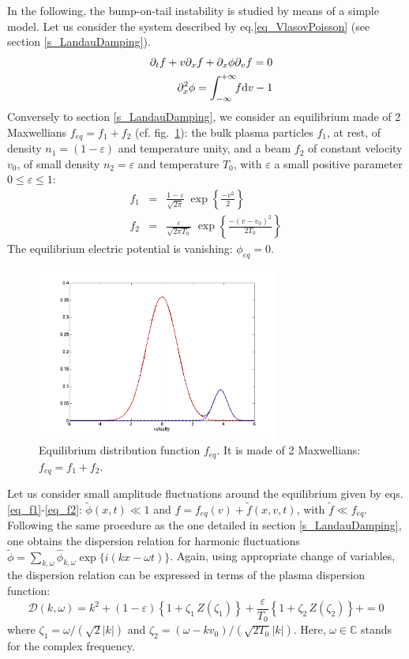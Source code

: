 \documentclass[11pt]{article}
\newcommand{\dd}{\textrm d}
\newcommand{\beqa}{\begin{eqnarray}}
\newcommand{\eeqa}{\end{eqnarray}}
\begin{document}
In the following, the bump-on-tail instability is studied by means of a simple model. Let us consider the system described by eq.\eqref{eq_VlasovPoisson} (see section \ref{s_LandauDamping}).
\beqa
  && \partial_t f + v\partial_x f + \partial_x\phi \partial_v f = 0
  \label{eq_Vlasov2D} \\
  && \partial_x^2\phi = \int_{-\infty}^{+\infty}\!\! f\dd v - 1
  \label{eq_Poisson2D}
\eeqa
Conversely to section \ref{s_LandauDamping}, we consider an equilibrium made of 2 Maxwellians $f_{eq} = f_1 +f_2$ (cf. fig.~\ref{fig_BonT_Feq}): the bulk plasma particles $f_1$, at rest, of density $n_1=(1-\varepsilon)$ and temperature unity, and a beam $f_2$ of constant velocity $v_0$, of small density $n_2=\varepsilon$ and temperature $T_0$, with $\varepsilon$ a small positive parameter $0\leq \varepsilon \leq1$:
\beqa
f_1 &=& \frac{1-\varepsilon}{\sqrt{2\pi}}\; \exp\left\{ \frac{-v^2}{2}\right\}
\label{eq_f1} \\
f_2 &=& \frac{\varepsilon}{\sqrt{2\pi T_0}}\;
\exp\left\{ \frac{-(v-v_0)^2}{2T_0}\right\}
\label{eq_f2}
\eeqa
The equilibrium electric potential is vanishing: $\phi_{eq}=0$. \\

\begin{figure}[!h]
\begin{center}
  \includegraphics[width=8cm]{Figures/Fig_Feq_BoT.png}
\caption{Equilibrium distribution function $f_{eq}$. It is made of 2 Maxwellians: $f_{eq} = f_1 +f_2$.} \label{fig_BonT_Feq}
\end{center}
\end{figure}

Let us consider small amplitude fluctuations around the equilibrium given by eqs.\eqref{eq_f1}-\eqref{eq_f2}: $\tilde\phi(x,t) \ll1$ and $f=f_{eq}(v) + \tilde f(x,v,t)$, with $\tilde f\ll f_{eq}$. Following the same procedure as the one detailed in section \ref{s_LandauDamping}, one obtains the dispersion relation for harmonic fluctuations $\tilde \phi = \sum_{k,\omega} \hat \phi_{k,\omega} \exp\{i(kx-\omega t)\}$. Again, using appropriate change of variables, the dispersion relation can be expressed in terms of the plasma dispersion function:
\begin{equation}
  \label{eq_VlasovPoisson_reldisp_BoT_FC}
  \mathcal{D} (k,\omega)= k^2 
  + (1-\varepsilon)\left\{ 1 + \zeta_1 \, Z(\zeta_1) \right\} 
  + \frac{\varepsilon}{T_0}\left\{ 1 + \zeta_2 \, Z(\zeta_2) \right\} + = 0
\end{equation}
where $\zeta_1 = \omega/(\sqrt{2}|k|)$ and $\zeta_2 = (\omega-kv_0)/(\sqrt{2T_0}|k|)$. Here, $\omega \in \mathbb{C}$ stands for the complex frequency. \\
\end{document}
